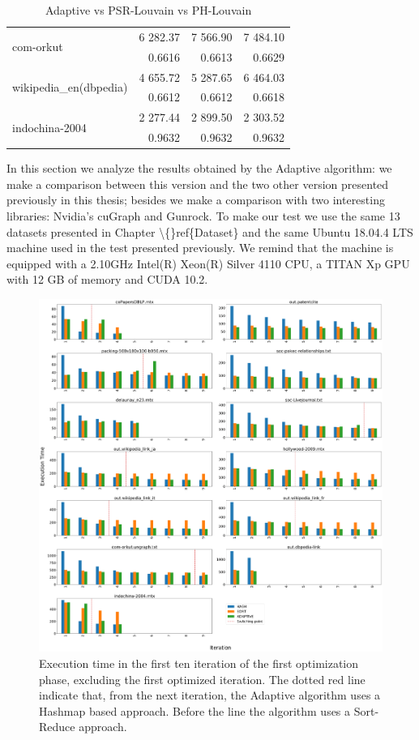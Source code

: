 \begin{table}[h]
\begin{tabular}{ |l||r||r|r|}
		\multirow{ 2}{*}{com-orkut }				& 6 282.37	& 7 566.90 	& 7 484.10 \\
													& 0.6616	& 0.6613 	& 0.6629 \\\hline
		\multirow{ 2}{*}{wikipedia\_en(dbpedia)}	& 4 655.72	& 5 287.65 	& 6 464.03 \\
													& 0.6612 	& 0.6612 	& 0.6618 \\\hline
		\multirow{ 2}{*}{indochina-2004}			& 2 277.44 	& 2 899.50 	& 2 303.52 \\
													& 0.9632	& 0.9632 	& 0.9632 \\\hline
	\end{tabular}
	\caption{\label{tab:adaptive} Adaptive vs PSR-Louvain vs PH-Louvain}
\end{table} 
\newpage
\noindent In this section we analyze the results obtained by the Adaptive algorithm: we make a comparison between this version and the two other version presented previously in this thesis; besides we make a comparison with two interesting libraries: Nvidia's cuGraph and Gunrock.
To make our test we use the same 13 datasets presented in Chapter \textbackslash\{\}ref\{Dataset\} and the same Ubuntu 18.04.4 LTS machine used in the test presented previously. We remind that the machine is equipped with a 2.10GHz Intel(R) Xeon(R) Silver 4110 CPU, a TITAN Xp GPU with 12 GB of memory and CUDA 10.2.
\begin{figure}[t!]
	\centering
	\includegraphics[width=1\linewidth]{0-resources/adaptive-vs-other}
	\caption{Execution time in the first ten iteration of the first optimization phase, excluding the first optimized iteration. The dotted red line indicate that, from the next iteration, the Adaptive algorithm uses a Hashmap based approach. Before the line the algorithm uses a Sort-Reduce approach.}
	\label{fig:adaptive-vs-other}
\end{figure}
